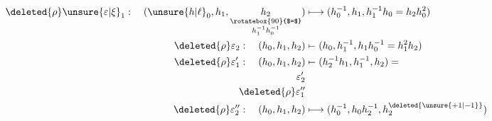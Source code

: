 \[
\begin{aligned}
\deleted{\rho}\unsure{\varepsilon|\xi}_1:\quad
 (\unsure{h|\ell}_0,h_1,\underset{\substack{\rotatebox{90}{$=$}\\h_1^{-1}h_0^{-1}}}{h_2})
 &\longmapsto (h_0^{-1},h_1,h_1^{-1}h_0=h_2h_0^2)\\
\deleted{\rho}\varepsilon_2:\quad(h_0,h_1,h_2)&\mathrel{\mapstochar\relbar}(h_0,h_1^{-1},h_1h_0^{-1}=h_1^2h_2)\\
\deleted{\rho}\varepsilon'_1:\quad(h_0,h_1,h_2)&\mathrel{\mapstochar\relbar}(h_{2}^{-1}h_1,h_1^{-1},h_2)=\\
\varepsilon'_2&\\
\deleted{\rho}\varepsilon''_1&\\
\deleted{\rho}\varepsilon''_2:\quad(h_0,h_1,h_2)&\longmapsto(h_0^{-1},h_0h_2^{-1},h_2^{\deleted{\unsure{+1|-1}}})
\end{aligned}
\]

